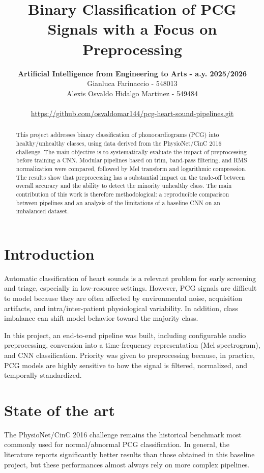\documentclass[12pt,a4paper]{article}
\title{Binary Classification of PCG Signals with a Focus on Preprocessing}
\author{
    \textbf{Artificial Intelligence from Engineering to Arts - a.y. 2025/2026}
    \\
    Gianluca Farinaccio - 548013 \\
    Alexis Osvaldo Hidalgo Martinez - 549484 \\
    \\
    \url{https://github.com/osvaldomar144/pcg-heart-sound-pipelines.git}
}
\begin{document}
\maketitle

\begin{abstract}
This project addresses binary classification of phonocardiograms (PCG) into
healthy/unhealthy classes, using data derived from the PhysioNet/CinC 2016 challenge.
The main objective is to systematically evaluate the impact of preprocessing before
training a CNN. Modular pipelines based on trim, band-pass filtering, and RMS
normalization were compared, followed by Mel transform and logarithmic compression.
The results show that preprocessing has a substantial impact on the trade-off between
overall accuracy and the ability to detect the minority unhealthy class. The main
contribution of this work is therefore methodological: a reproducible comparison between
pipelines and an analysis of the limitations of a baseline CNN on an imbalanced dataset.
\end{abstract}

\section{Introduction}
Automatic classification of heart sounds is a relevant problem for early screening and
triage, especially in low-resource settings. However, PCG signals are difficult to model
because they are often affected by environmental noise, acquisition artifacts, and
intra/inter-patient physiological variability. In addition, class imbalance can shift model
behavior toward the majority class.

In this project, an end-to-end pipeline was built, including configurable audio
preprocessing, conversion into a time-frequency representation (Mel spectrogram), and CNN
classification. Priority was given to preprocessing because, in practice, PCG models are
highly sensitive to how the signal is filtered, normalized, and temporally standardized.

\section{State of the art}
The PhysioNet/CinC 2016 challenge remains the historical benchmark most commonly used for
normal/abnormal PCG classification. In general, the literature reports significantly
better results than those obtained in this baseline project, but these performances almost
always rely on more complex pipelines.
\end{document}
